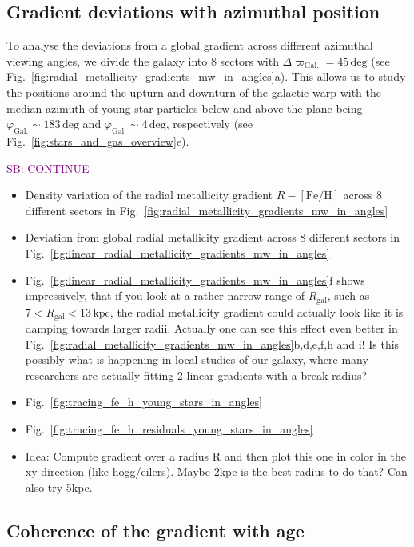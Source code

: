 \documentclass[fleqn,usenatbib]{mnras}
\newcommand{\SB}[1]{{\textcolor{purple}{SB: #1}}}
\begin{document}
\subsection{Gradient deviations with azimuthal position}
\label{sec:coherence_azimuth_radial_metallicity_gradients}

To analyse the deviations from a global gradient across different azimuthal viewing angles, we divide the galaxy into 8 sectors with $\Delta \varpi_\mathrm{Gal.} = 45\,\mathrm{deg}$ (see Fig.~\ref{fig:radial_metallicity_gradients_mw_in_angles}a). This allows us to study the positions around the upturn and downturn of the galactic warp with the median azimuth of young star particles below and above the plane being $\varphi_\mathrm{Gal.} \sim 183\,\mathrm{deg}$ and $\varphi_\mathrm{Gal.} \sim 4\,\mathrm{deg}$, respectively (see Fig.~\ref{fig:stars_and_gas_overview}e).

\SB{CONTINUE}

\begin{itemize}
    \item Density variation of the radial metallicity gradient $R-\mathrm{[Fe/H]}$ across 8 different sectors in Fig.~\ref{fig:radial_metallicity_gradients_mw_in_angles}
    \item Deviation from global radial metallicity gradient across 8 different sectors in Fig.~\ref{fig:linear_radial_metallicity_gradients_mw_in_angles}
    \item Fig.~\ref{fig:linear_radial_metallicity_gradients_mw_in_angles}f shows impressively, that if you look at a rather narrow range of $R_\mathrm{gal}$, such as $7 < R_\mathrm{gal} < 13\,\mathrm{kpc}$, the radial metallicity gradient could actually look like it is damping towards larger radii. Actually one can see this effect even better in Fig.~\ref{fig:radial_metallicity_gradients_mw_in_angles}b,d,e,f,h and i! Is this possibly what is happening in local studies of our galaxy, where many researchers are actually fitting 2 linear gradients with a break radius?
    \item Fig.~\ref{fig:tracing_fe_h_young_stars_in_angles}
    \item Fig.~\ref{fig:tracing_fe_h_residuals_young_stars_in_angles}
    \item Idea: Compute gradient over a radius R and then plot this one in color in the xy direction (like hogg/eilers). Maybe 2kpc is the best radius to do that? Can also try 5kpc.
\end{itemize}


\subsection{Coherence of the gradient with age}
\label{sec:coherence_age_radial_metallicity_gradients}
\end{document}
